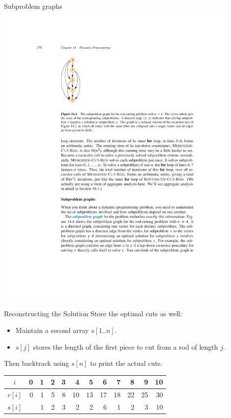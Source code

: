 \documentclass[aspectratio=169]{beamer}
\begin{document}
\begin{frame}{Subproblem graphs}
    \centering
    \includegraphics[width=0.9\textwidth,clip=true,trim=5cm 16cm 3cm 4cm]{figures/p370}
\end{frame}

\begin{frame}{Reconstructing the Solution}
    Store the optimal cuts as well:

    \begin{itemize}
        \item Maintain a second array $s[1..n]$.
        \item $s[j]$ stores the length of the first piece to cut from a rod of length $j$.
    \end{itemize}

    Then backtrack using $s[n]$ to print the actual cuts.\\
    \vspace{5mm}
    \begin{tabular}{c | r r r r r r r r r r r }
        \large
        $i$ & 0 & 1 & 2 & 3 & 4 & 5 & 6 & 7 & 8 & 9 & 10 \\ \hline
        $r[i]$ & 0 & 1 & 5 & 8 & 10 & 13 & 17 & 18 & 22 & 25 & 30 \\
        $s[i]$ &   & 1 & 2 & 3 & 2 & 2 & 6 & 1 & 2 & 3 & 10 \\
    \end{tabular}
\end{frame}
\end{document}
